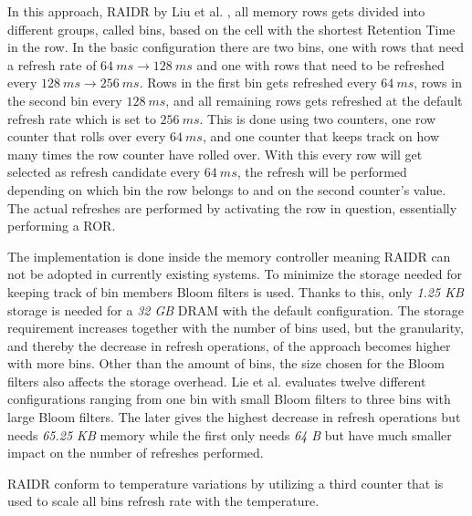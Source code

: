 In this approach, RAIDR by Liu et al. \cite{raidr}, all memory rows gets divided into different groups, called bins, based on the cell with the shortest Retention Time in the row. In the basic configuration there are two bins, one with rows that need a refresh rate of $64\:ms \to 128\:ms$ and one with rows that need to be refreshed every $128\:ms \to 256\:ms$. Rows in the first bin gets refreshed every $64\:ms$, rows in the second bin every $128\:ms$, and all remaining rows gets refreshed at the default refresh rate which is set to $256\:ms$. This is done using two counters, one row counter that rolls over every $64\:ms$, and one counter that keeps track on how many times the row counter have rolled over. With this every row will get selected as refresh candidate every $64\:ms$, the refresh will be performed depending on which bin the row belongs to and on the second counter's value. The actual refreshes are performed by activating the row in question, essentially performing a ROR.

The implementation is done inside the memory controller meaning RAIDR can not be adopted in currently existing systems. To minimize the storage needed for keeping track of bin members Bloom filters is used. Thanks to this, only \textit{1.25 KB} storage is needed for a \textit{32 GB} DRAM with the default configuration. The storage requirement increases together with the number of bins used, but the granularity, and thereby the decrease in refresh operations, of the approach becomes higher with more bins. Other than the amount of bins, the size chosen for the Bloom filters also affects the storage overhead. Lie et al. evaluates twelve different configurations ranging from one bin with small Bloom filters to three bins with large Bloom filters. The later gives the highest decrease in refresh operations but needs \textit{65.25 KB} memory while the first only needs \textit{64 B} but have much smaller impact on the number of refreshes performed.

RAIDR conform to temperature variations by utilizing a third counter that is used to scale all bins refresh rate with the temperature. 